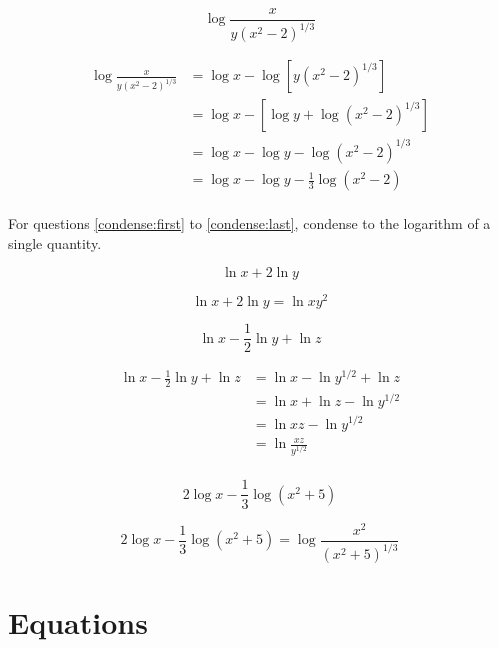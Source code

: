 \documentclass[fleqn,addpoints]{exam}
\begin{document}
\begin{questions}
\begin{solution}[4 cm]
\end{solution}

\ifprintanswers
\else
\pagebreak
\fi

\question[10]
\label{transform:last}
\[
  \log \frac{x}{y(x^2-2)^{1/3}} 
\]
\begin{solution}[4 cm]
\begin{align*}
  \log \frac{x}{y(x^2-2)^{1/3}} &= \log x - \log \left[ y(x^2-2)^{1/3} \right] \\
  &= \log x - \left[ \log y + \log(x^2-2)^{1/3} \right] \\
  &= \log x - \log y - \log(x^2-2)^{1/3} \\
  &= \log x - \log y - \frac{1}{3}\log(x^2-2) \\
\end{align*}
\end{solution}

For questions \ref{condense:first} to \ref{condense:last}, condense to the logarithm of a single quantity.

\question[5]
\label{condense:first}
\[
  \ln x + 2 \ln y
\]
\begin{solution}[3 cm]
\[
  \ln x + 2 \ln y = \ln xy^2
\]

\end{solution}

\question[7]
\[
  \ln x - \frac{1}{2} \ln y + \ln z
\]
\begin{solution}[4 cm]
\begin{align*}
  \ln x - \frac{1}{2} \ln y + \ln z &= \ln x - \ln y^{1/2} + \ln z  \\
  &= \ln x + \ln z - \ln y^{1/2}   \\
  &= \ln xz - \ln y^{1/2}   \\
  &= \ln \frac{xz}{y^{1/2}} \\
\end{align*}
\end{solution}

\question[8]
\label{condense:last}
\[
  2 \log x - \frac{1}{3} \log (x^2 + 5)
\]
\begin{solution}[4 cm]
\[
  2 \log x - \frac{1}{3} \log (x^2 + 5) = \log \frac{x^2}{(x^2+5)^{1/3}}
\]
\end{solution}

\ifprintanswers
\else
\pagebreak
\fi

\section{Equations}


\end{questions}
\end{document}
